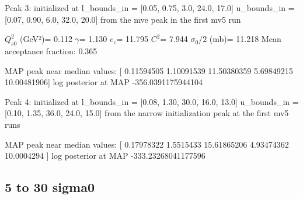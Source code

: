 \documentclass{article}
\begin{document}
Peak 3: initialized at 
l_bounds_in = [0.05, 0.75, 3.0, 24.0, 17.0]
u_bounds_in = [0.07, 0.90, 6.0, 32.0, 20.0]
from the mve peak in the first mv5 run

$Q_{s0}^{2}$ (GeV²)= 0.112
$\gamma$= 1.130
$e_c$= 11.795
$C^{2}$= 7.944
$\sigma_0/2$ (mb)= 11.218
Mean acceptance fraction: 0.365

MAP peak near median values: [ 0.11594505  1.10091539 11.50380359  5.69849215 10.00481906]
log posterior at MAP -356.0391175944104


Peak 4: initialized at
l_bounds_in = [0.08, 1.30, 30.0, 16.0, 13.0]
u_bounds_in = [0.10, 1.35, 36.0, 24.0, 15.0]
from the narrow initialization peak at the first mv5 runs

MAP peak near median values: [ 0.17978322  1.5515433  15.61865206  4.93474362 10.0004294 ]
log posterior at MAP -333.23268041177596

\subsection{5 to 30 sigma0}
\end{document}
